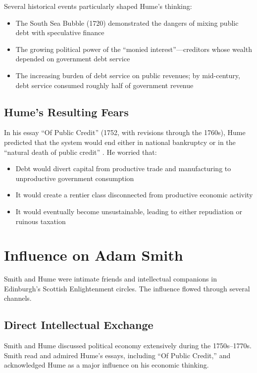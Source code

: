 \documentclass[12pt]{article}
\begin{document}
Several historical events particularly shaped Hume's thinking:

\begin{itemize}
\item The South Sea Bubble (1720) demonstrated the dangers of mixing public debt with speculative finance
\item The growing political power of the ``monied interest''---creditors whose wealth depended on government debt service
\item The increasing burden of debt service on public revenues; by mid-century, debt service consumed roughly half of government revenue
\end{itemize}

\subsection{Hume's Resulting Fears}

In his essay ``Of Public Credit'' (1752, with revisions through the 1760s), Hume predicted that the system would end either in national bankruptcy or in the ``natural death of public credit'' \citep{hume1752public}. He worried that:

\begin{itemize}
\item Debt would divert capital from productive trade and manufacturing to unproductive government consumption
\item It would create a rentier class disconnected from productive economic activity
\item It would eventually become unsustainable, leading to either repudiation or ruinous taxation
\end{itemize}

\section{Influence on Adam Smith}

Smith and Hume were intimate friends and intellectual companions in Edinburgh's Scottish Enlightenment circles. The influence flowed through several channels.

\subsection{Direct Intellectual Exchange}

Smith and Hume discussed political economy extensively during the 1750s--1770s. Smith read and admired Hume's essays, including ``Of Public Credit,'' and acknowledged Hume as a major influence on his economic thinking.
\end{document}
